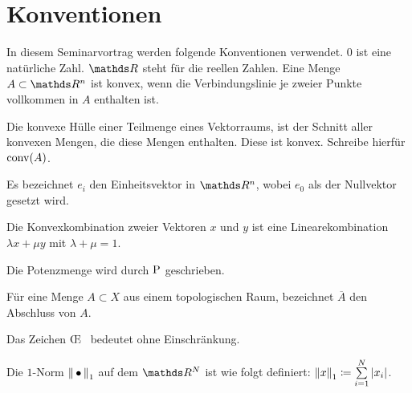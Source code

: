 
\section*{Konventionen}

In diesem Seminarvortrag werden folgende Konventionen verwendet.  $0$
ist eine natürliche Zahl.  $\R$ steht für die reellen Zahlen. Eine
Menge $A \subset \R^n$ ist konvex, wenn die Verbindungslinie je zweier
Punkte vollkommen in $A$ enthalten ist.

Die konvexe Hülle einer Teilmenge eines Vektorraums, ist der Schnitt
aller konvexen Mengen, die diese Mengen enthalten. Diese ist
konvex. Schreibe hierfür $\conv(A)$.

Es bezeichnet $e_i$ den Einheitsvektor in $\R^n$, wobei $e_0$ als der Nullvektor gesetzt wird.

Die Konvexkombination zweier Vektoren $x$ und $y$ ist eine
Linearekombination $\lambda x + \mu y$ mit $\lambda + \mu = 1$.

Die Potenzmenge wird durch $\pow$ geschrieben.

Für eine Menge $A \subset X$ aus einem topologischen Raum, bezeichnet
$\overline{A}$ den Abschluss von $A$.

Das Zeichen \OE~ bedeutet ohne Einschränkung.

Die $1$-Norm $\nn_1$ auf dem $\R^N$ ist wie folgt definiert:
$\nn[x]_1 \coloneqq \sp{1}{N} |x_i|$.



